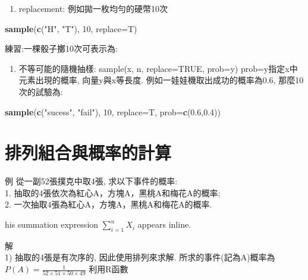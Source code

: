 \documentclass[]{book}
\newenvironment{Shaded}{\begin{snugshade}}{\end{snugshade}}
\newcommand{\KeywordTok}[1]{\textcolor[rgb]{0.13,0.29,0.53}{\textbf{#1}}}
\newcommand{\DataTypeTok}[1]{\textcolor[rgb]{0.13,0.29,0.53}{#1}}
\newcommand{\DecValTok}[1]{\textcolor[rgb]{0.00,0.00,0.81}{#1}}
\newcommand{\FloatTok}[1]{\textcolor[rgb]{0.00,0.00,0.81}{#1}}
\newcommand{\StringTok}[1]{\textcolor[rgb]{0.31,0.60,0.02}{#1}}
\newcommand{\NormalTok}[1]{#1}
\providecommand{\tightlist}{%
  \setlength{\itemsep}{0pt}\setlength{\parskip}{0pt}}
\theoremstyle{definition}
\theoremstyle{definition}
\theoremstyle{definition}
\theoremstyle{remark}
\begin{document}
\begin{enumerate}
\def\labelenumi{\arabic{enumi}.}
\setcounter{enumi}{1}
\tightlist
\item
  replacement: 例如拋一枚均勻的硬幣10次
\end{enumerate}

\begin{Shaded}
\begin{Highlighting}[]
 \KeywordTok{sample}\NormalTok{(}\KeywordTok{c}\NormalTok{(}\StringTok{"H"}\NormalTok{, }\StringTok{"T"}\NormalTok{), }\DecValTok{10}\NormalTok{, }\DataTypeTok{replace=}\NormalTok{T)}
\end{Highlighting}
\end{Shaded}

練習:一棵骰子擲10次可表示為:

\begin{enumerate}
\def\labelenumi{\arabic{enumi})}
\setcounter{enumi}{2}
\tightlist
\item
  不等可能的隨機抽樣: sample(x, n, replace=TRUE, prob=y)
  prob=y指定x中元素出現的概率, 向量y與x等長度.
  例如一娃娃機取出成功的概率為0.6, 那麼10次的試驗為:
\end{enumerate}

\begin{Shaded}
\begin{Highlighting}[]
\KeywordTok{sample}\NormalTok{(}\KeywordTok{c}\NormalTok{(}\StringTok{"sucess"}\NormalTok{, }\StringTok{"fail"}\NormalTok{), }\DecValTok{10}\NormalTok{, }\DataTypeTok{replace=}\NormalTok{T, }\DataTypeTok{prob=}\KeywordTok{c}\NormalTok{(}\FloatTok{0.6}\NormalTok{,}\FloatTok{0.4}\NormalTok{))}
\end{Highlighting}
\end{Shaded}

\section{排列組合與概率的計算}

例 從一副52張撲克中取4張, 求以下事件的概率:\\
1. 抽取的4張依次為紅心A，方塊A，黑桃A和梅花A的概率;\\
2. 一次抽取4張為紅心A，方塊A，黑桃A和梅花A的概率.

his summation expression \(\sum_{i=1}^n X_i\) appears inline.

解\\
1) 抽取的4張是有次序的, 因此使用排列來求解. 所求的事件(記為A)概率為
\(P(A)=\frac{1}{52 \times 51 \times 50 \times 49}\) 利用R函數
\end{document}
